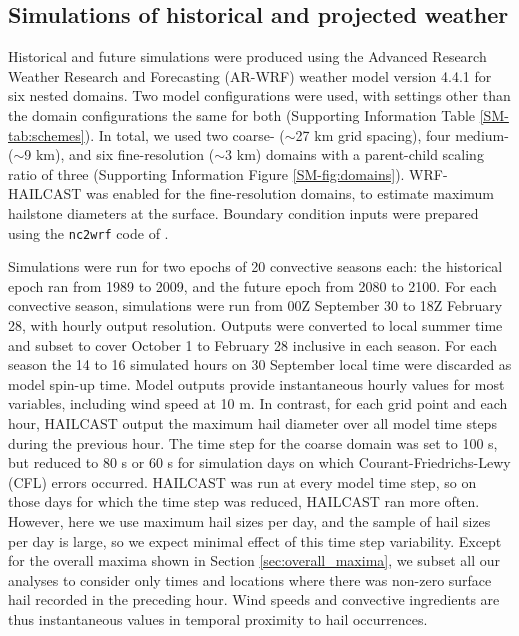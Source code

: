 \documentclass[]{agujournal2019}\usepackage[]{graphicx}\usepackage[]{xcolor}
\begin{document}
\subsection{Simulations of historical and projected weather}

Historical and future simulations were produced using the Advanced Research Weather Research and Forecasting (AR-WRF) weather model version 4.4.1 \cite{Skamarock_2021} for six nested domains. Two model configurations were used, with settings other than the domain configurations the same for both (Supporting Information Table \ref{SM-tab:schemes}). In total, we used two coarse- ($\sim$27 km grid spacing), four medium- ($\sim$9 km), and six fine-resolution ($\sim$3 km) domains with a parent-child scaling ratio of three (Supporting Information Figure \ref{SM-fig:domains}). WRF-HAILCAST \cite{Adams-Selin_WF_2019} was enabled for the fine-resolution domains, to estimate maximum hailstone diameters at the surface. Boundary condition inputs were prepared using the \texttt{nc2wrf} code of . 

Simulations were run for two epochs of 20 convective seasons each: the historical epoch ran from 1989 to 2009, and the future epoch from 2080 to 2100. For each convective season, simulations were run from 00Z September 30 to 18Z February 28, with hourly output resolution. Outputs were converted to local summer time and subset to cover October 1 to February 28 inclusive in each season. For each season the 14 to 16 simulated hours on 30 September local time were discarded as model spin-up time. Model outputs provide instantaneous hourly values for most variables, including wind speed at 10 m. In contrast, for each grid point and each hour, HAILCAST output the maximum hail diameter over all model time steps during the previous hour. The time step for the coarse domain was set to 100 s, but reduced to 80 s or 60 s for simulation days on which Courant-Friedrichs-Lewy (CFL) errors occurred. HAILCAST was run at every model time step, so on those days for which the time step was reduced, HAILCAST ran more often. However, here we use maximum hail sizes per day, and the sample of hail sizes per day is large, so we expect minimal effect of this time step variability. Except for the overall maxima shown in Section \ref{sec:overall_maxima}, we subset all our analyses to consider only times and locations where there was non-zero surface hail recorded in the preceding hour. Wind speeds and convective ingredients are thus instantaneous values in temporal proximity to hail occurrences.
\end{document}
